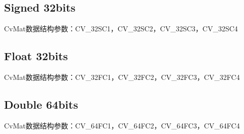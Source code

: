 \documentclass[12pt]{article}
\begin{document}
\subsection{Signed 32bits}
CvMat数据结构参数：CV\_32SC1，CV\_32SC2，CV\_32SC3，CV\_32SC4

\subsection{Float 32bits}
CvMat数据结构参数：CV\_32FC1，CV\_32FC2，CV\_32FC3，CV\_32FC4

\subsection{Double 64bits}
CvMat数据结构参数：CV\_64FC1，CV\_64FC2，CV\_64FC3，CV\_64FC4







\end{document}
